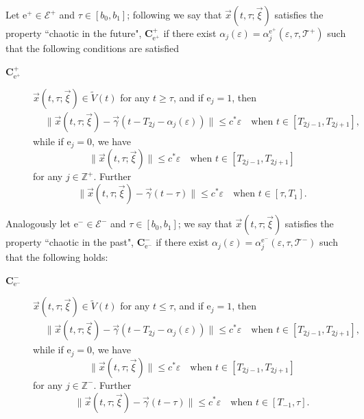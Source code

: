 \documentclass[10pt]{article}
\numberwithin{equation}{section}
\def\al{\alpha}
\def\ga{\vec{\gamma}}
\def\ep{\varepsilon}
\def\Z{{\mathbb Z}}
\def\ee{{\mathrm e}}
\def\EE{{\mathcal E}}
\def\TT{{\mathcal T}}
\def\xxi{\vec{\xi}}
\def\x{\vec{x}}
\newcommand\bs[1]{{\boldsymbol{#1}}}
\theoremstyle{definition}
\theoremstyle{remark}
\begin{document}
Let $\ee^{+} \in \EE^{+}$ and $\tau\in[b_0,b_1]$;
following \cite{CFPrestate} we say that $\x(t,\tau; \xxi)$ satisfies the property  ``chaotic in the future",
 $\bs{C_{\ee^+}^+}$ if
there   exist
  $\alpha_j(\ep)= \al_j^{\ee^+}(\ep,\tau,\TT^+)$ such that the following conditions are satisfied
 \begin{description}
  \item[$\bs{C_{\ee^+}^+}$] $\x(t,\tau; \xxi) \in \tilde{V}(t)$ for any $t \ge \tau$,
 and	if $\ee_j=1$, then
	\begin{equation}\label{ej+=1w}
	\begin{split}
	&   \|\x(t,\tau; \xxi )-\ga(t-T_{2j}-\al_j(\ep)) \| \le c^*\ep \quad \textrm{when $t \in [T_{2j-1}, T_{2j+1}]$},
	\end{split}
	\end{equation}
	while if $\ee_j=0$, we have
	\begin{equation}\label{ej+=0w}
	\|\x(t,\tau; \xxi) \| \le c^*\ep  \quad \textrm{when $t \in [T_{2j-1}, T_{2j+1} ] $}
	\end{equation}
	for any $j \in \Z^+$. Further
	\begin{equation}\label{ej+=tau}
	\|\x(t,\tau; \xxi)-\ga(t-\tau) \| \le c^*\ep  \quad \textrm{when $t \in [\tau, T_1] $}.
	\end{equation}
\end{description}
Analogously let $\ee^{-} \in \EE^{-}$ and $\tau\in[b_0,b_1]$; we say that $\x(t,\tau; \xxi)$ satisfies the property
 ``chaotic in the past", $\bs{C_{\ee^-}^-}$ if
there exist $\alpha_j(\ep)= \al_j^{\ee^-}(\ep,\tau,\TT^-)$ such that
 the following holds:
 \begin{description}
  \item[$\bs{C_{\ee^-}^-}$]  $\x(t,\tau; \xxi) \in \tilde{V}(t)$ for any $t \le \tau$, and
	if $\ee_j=1$, then
	\begin{equation}\label{ej-=1w}
	\begin{split}
	&   \|\x(t,\tau; \xxi )-\ga(t-T_{2j}-\al_j(\ep)) \| \le c^*\ep \quad \textrm{when $t \in [T_{2j-1}, T_{2j+1} ]$},
	\end{split}
	\end{equation}
	while if $\ee_j=0$, we have
	\begin{equation}\label{ej-=0w}
	\|\x(t,\tau; \xxi) \| \le c^*\ep  \quad \textrm{when $t \in [T_{2j-1}, T_{2j+1} ] $}
	\end{equation}
	for any $j \in \Z^-$. Further
	\begin{equation}\label{ej-=tau}
	\|\x(t,\tau; \xxi)-\ga(t-\tau) \| \le c^*\ep  \quad \textrm{when $t \in [T_{-1}, \tau ] $}.
	\end{equation}
\end{description}
\end{document}
